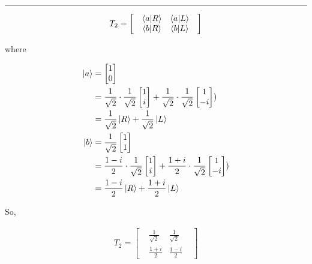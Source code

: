 \documentclass[12pt, oneside]{article}
\newenvironment{answer}
  {\vspace*{0.2cm} \rule{12cm}{0.02cm} \vspace*{0.2cm}}
  {\vspace*{0.2cm}}
\begin{document}
\begin{enumerate}
\begin{enumerate}
\begin{answer}
      \begin{align*}
        T_2 = \begin{bmatrix}
                &\bra{a}\ket{R} &\bra{a}\ket{L} &\\
                &\bra{b}\ket{R} &\bra{b}\ket{L} &
              \end{bmatrix}
      \end{align*}

      where

      \begin{align*}
        \ket{a} &= \begin{bmatrix}1 \\  0\end{bmatrix} \\
                &= \frac{1}{\sqrt{2}}\cdot\frac{1}{\sqrt{2}}\begin{bmatrix}1 \\  i\end{bmatrix} + \frac{1}{\sqrt{2}}\cdot\frac{1}{\sqrt{2}}\begin{bmatrix}1 \\  -i\end{bmatrix})\\
                &= \frac{1}{\sqrt{2}}\ket{R} + \frac{1}{\sqrt{2}}\ket{L}\\
        \ket{b} &= \frac{1}{\sqrt{2}}\begin{bmatrix}1 \\  1\end{bmatrix}\\
                &= \frac{1 - i}{2}\cdot\frac{1}{\sqrt{2}}\begin{bmatrix}1 \\  i\end{bmatrix} + \frac{1 + i}{2}\cdot\frac{1}{\sqrt{2}}\begin{bmatrix}1 \\  -i\end{bmatrix})\\
                &= \frac{1-i}{2}\ket{R} + \frac{1+i}{2}\ket{L}
      \end{align*}

      So,

      \begin{align*}
        T_2 = \begin{bmatrix}
                &\frac{1}{\sqrt{2}} &\frac{1}{\sqrt{2}} &\\
                &\frac{1+i}{2} &\frac{1-i}{2} &
              \end{bmatrix}
      \end{align*}


\end{answer}
\end{enumerate}
\end{enumerate}
\end{document}
